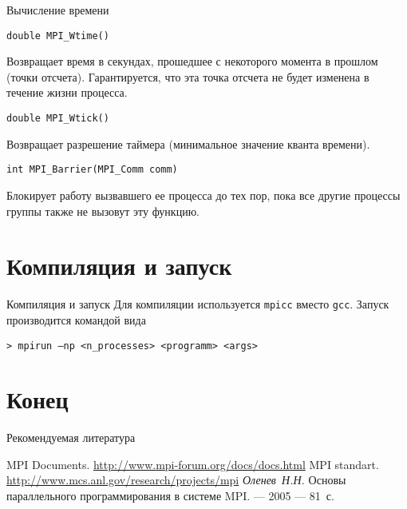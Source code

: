 \begin{frame}[fragile]{Вычисление времени}

\begin{lstlisting}
double MPI_Wtime()
\end{lstlisting}

Возвращает время в секундах, прошедшее с  некоторого момента в прошлом (точки отсчета). Гарантируется, что эта точка отсчета не будет изменена в течение жизни процесса.

\begin{lstlisting}
double MPI_Wtick()
\end{lstlisting}

Возвращает разрешение таймера (минимальное значение кванта времени).

\begin{lstlisting}
int MPI_Barrier(MPI_Comm comm)
\end{lstlisting}

Блокирует работу вызвавшего ее процесса до тех пор, пока все другие процессы группы также не вызовут эту функцию.

\end{frame}

\section{Компиляция и запуск}

\begin{frame}[fragile]{Компиляция и запуск}
Для компиляции используется \texttt{mpicc} вместо \texttt{gcc}.
\vfill
Запуск производится командой вида

\begin{lstlisting}
> mpirun –np <n_processes> <programm> <args>
\end{lstlisting}
\end{frame}

\section*{Конец}

\begin{frame}[allowframebreaks]{Рекомендуемая литература}
\begin{thebibliography}{99}
    \bibitem{} MPI Documents. \url{http://www.mpi-forum.org/docs/docs.html}
    \bibitem{} MPI standart. \url{http://www.mcs.anl.gov/research/projects/mpi}
    \bibitem{} \textit{Оленев~Н.Н.} Основы параллельного программирования в
    системе MPI. --- 2005 --- 81~с.
\end{thebibliography}
\end{frame}

